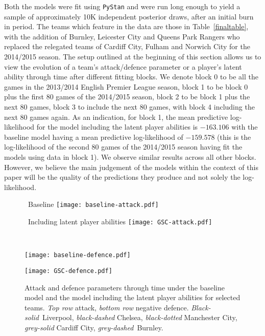\documentclass[11pt,a4paper]{article}
\begin{document}
Both the models were fit using \verb+PyStan+ and were run long enough 
to yield a sample of approximately 10K independent posterior draws, 
after an initial burn in period. The teams which feature in the data 
are those in Table~\ref{finaltable}, with the addition of Burnley, 
Leicester City and Queens Park Rangers who replaced the relegated 
teams of Cardiff City, Fulham and Norwich City for the 2014/2015 
season. The setup outlined at the beginning of this section allows us to view the 
evolution of a team's attack/defence parameter or a player's latent 
ability through time after different fitting blocks. We denote block 
0 to be all the games in the 2013/2014 English Premier League 
season, block 1 to be block 0 plus the first 80 games of the 
2014/2015 season, block 2 to be block 1 plus the next 80 games, 
block 3 to include the next 80 games, with block 4 including the 
next 80 games again. As an indication, for block 1, the mean predictive  
log-likelihood for the model including the latent player abilities is 
$-163.106$ with the baseline model having a mean predictive log-likelihood 
of $-159.578$ (this is the log-likelihood of the second 80 games of the 
2014/2015 season having fit the models using data in block 1). 
We observe similar results across all other blocks. However, 
we believe the main judgement of the models within the context of this 
paper will be the quality of the predictions they produce and not solely 
the log-likelihood. 

\begin{figure}[t]
\begin{minipage}[b]{0.48\linewidth}
        \centering
        \qquad\, Baseline\vspace{0.01cm}
        \texttt{[image: baseline-attack.pdf]}
\end{minipage} 
\begin{minipage}[b]{0.48\linewidth}
        \centering
        \qquad\, Including latent player abilities\vspace{0.01cm}
        \texttt{[image: GSC-attack.pdf]}
\end{minipage} \\
\begin{minipage}[b]{0.48\linewidth}
        \centering
        \texttt{[image: baseline-defence.pdf]}
\end{minipage} 
\begin{minipage}[b]{0.48\linewidth}
        \centering
        \texttt{[image: GSC-defence.pdf]}
\end{minipage}
      \caption{Attack and defence parameters through time under the baseline model and the model including the latent player abilities for selected teams. \emph{Top row} attack, \emph{bottom row} negative defence. \hbox{\emph{Black-solid} Liverpool}, \emph{black-dashed} Chelsea, \emph{black-dotted} Manchester City, \emph{grey-solid} Cardiff City, \hbox{\emph{grey-dashed} Burnley}.} \label{attdeffig}
\end{figure} 
\end{document}
